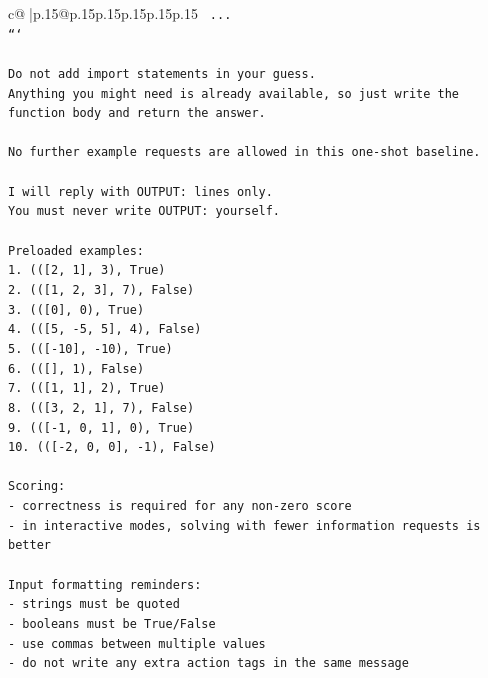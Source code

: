 \documentclass{article}
\begin{document}
{\begin{supertabular}{c@{$\;$}|p{.15\linewidth}@{}p{.15\linewidth}p{.15\linewidth}p{.15\linewidth}p{.15\linewidth}p{.15\linewidth}}
{{{\texttt{    ...} \\
\texttt{```} \\
\\ 
\texttt{Do not add import statements in your guess.} \\
\texttt{Anything you might need is already available, so just write the function body and return the answer.} \\
\\ 
\texttt{No further example requests are allowed in this one{-}shot baseline.} \\
\\ 
\texttt{I will reply with OUTPUT: lines only.} \\
\texttt{You must never write OUTPUT: yourself.} \\
\\ 
\texttt{Preloaded examples:} \\
\texttt{1. (({[}2, 1{]}, 3), True)} \\
\texttt{2. (({[}1, 2, 3{]}, 7), False)} \\
\texttt{3. (({[}0{]}, 0), True)} \\
\texttt{4. (({[}5, {-}5, 5{]}, 4), False)} \\
\texttt{5. (({[}{-}10{]}, {-}10), True)} \\
\texttt{6. (({[}{]}, 1), False)} \\
\texttt{7. (({[}1, 1{]}, 2), True)} \\
\texttt{8. (({[}3, 2, 1{]}, 7), False)} \\
\texttt{9. (({[}{-}1, 0, 1{]}, 0), True)} \\
\texttt{10. (({[}{-}2, 0, 0{]}, {-}1), False)} \\
\\ 
\texttt{Scoring:} \\
\texttt{{-} correctness is required for any non{-}zero score} \\
\texttt{{-} in interactive modes, solving with fewer information requests is better} \\
\\ 
\texttt{Input formatting reminders:} \\
\texttt{{-} strings must be quoted} \\
\texttt{{-} booleans must be True/False} \\
\texttt{{-} use commas between multiple values} \\
\texttt{{-} do not write any extra action tags in the same message} \\
\\ 
}}}
\end{supertabular}}
\end{document}
